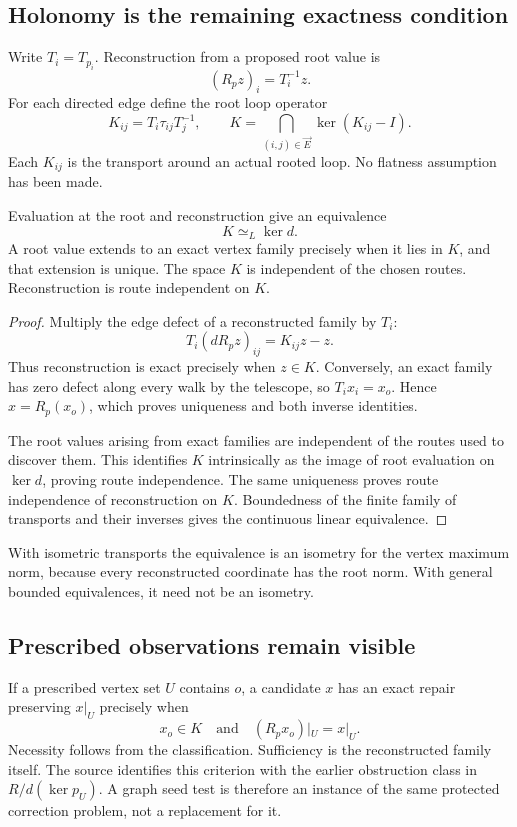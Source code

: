 \subsection{Holonomy is the remaining exactness condition}
Write \(T_i=T_{p_i}\). Reconstruction from a proposed root value is
\[
 (R_pz)_i=T_i^{-1}z.
\]
For each directed edge define the root loop operator
\[
 K_{ij}=T_i\tau_{ij}T_j^{-1},\qquad
 K=\bigcap_{(i,j)\in\vec E}\ker(K_{ij}-I).
\]
Each \(K_{ij}\) is the transport around an actual rooted loop. No flatness assumption has been made.

\begin{theorem}\label{KS41}
Evaluation at the root and reconstruction give an equivalence
\[
 K\simeq_L\ker d.
\]
A root value extends to an exact vertex family precisely when it lies in \(K\), and that extension is unique. The space \(K\) is independent of the chosen routes. Reconstruction is route independent on \(K\).
\end{theorem}
\begin{proof}
Multiply the edge defect of a reconstructed family by \(T_i\):
\[
 T_i(dR_pz)_{ij}=K_{ij}z-z.
\]
Thus reconstruction is exact precisely when \(z\in K\). Conversely, an exact family has zero defect along every walk by the telescope, so \(T_ix_i=x_o\). Hence \(x=R_p(x_o)\), which proves uniqueness and both inverse identities.

The root values arising from exact families are independent of the routes used to discover them. This identifies \(K\) intrinsically as the image of root evaluation on \(\ker d\), proving route independence. The same uniqueness proves route independence of reconstruction on \(K\). Boundedness of the finite family of transports and their inverses gives the continuous linear equivalence.
\end{proof}
With isometric transports the equivalence is an isometry for the vertex maximum norm, because every reconstructed coordinate has the root norm. With general bounded equivalences, it need not be an isometry.


\subsection{Prescribed observations remain visible}
If a prescribed vertex set \(U\) contains \(o\), a candidate \(x\) has an exact repair preserving \(x|_U\) precisely when
\[
 x_o\in K\quad\text{and}\quad (R_px_o)|_U=x|_U.
\]
Necessity follows from the classification. Sufficiency is the reconstructed family itself. The source identifies this criterion with the earlier obstruction class in \(R/d(\ker p_U)\). A graph seed test is therefore an instance of the same protected correction problem, not a replacement for it.


